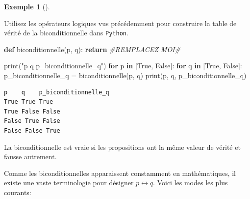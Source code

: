 \documentclass[
  letterpaper,
]{scrbook}
\newenvironment{Shaded}{}{}
\newcommand{\BuiltInTok}[1]{#1}
\newcommand{\CommentTok}[1]{\textcolor[rgb]{0.38,0.63,0.69}{\textit{#1}}}
\newcommand{\ControlFlowTok}[1]{\textcolor[rgb]{0.00,0.44,0.13}{\textbf{#1}}}
\newcommand{\KeywordTok}[1]{\textcolor[rgb]{0.00,0.44,0.13}{\textbf{#1}}}
\newcommand{\NormalTok}[1]{#1}
\newcommand{\OperatorTok}[1]{\textcolor[rgb]{0.40,0.40,0.40}{#1}}
\newcommand{\StringTok}[1]{\textcolor[rgb]{0.25,0.44,0.63}{#1}}
\newcommand{\VariableTok}[1]{\textcolor[rgb]{0.10,0.09,0.49}{#1}}
\theoremstyle{definition}
\newtheorem{example}{Exemple}[chapter]
\theoremstyle{definition}
\theoremstyle{plain}
\theoremstyle{remark}
\begin{document}
\leavevmode{}%
\begin{example}[]\label{exm-biconditionnelle-python}

Utilisez les opérateurs logiques vus précédemment pour construire la
table de vérité de la biconditionnelle dans \texttt{Python}.

\hypertarget{biconditionnelle-python-todo}{}
\begin{Shaded}
\begin{Highlighting}[]
\KeywordTok{def}\NormalTok{ biconditionnelle(p, q):}
    \ControlFlowTok{return} \CommentTok{\#REMPLACEZ MOI\#}

\BuiltInTok{print}\NormalTok{(}\StringTok{"p    q    p\_biconditionnelle\_q"}\NormalTok{)}
\ControlFlowTok{for}\NormalTok{ p }\KeywordTok{in}\NormalTok{ [}\VariableTok{True}\NormalTok{, }\VariableTok{False}\NormalTok{]:}
    \ControlFlowTok{for}\NormalTok{ q }\KeywordTok{in}\NormalTok{ [}\VariableTok{True}\NormalTok{, }\VariableTok{False}\NormalTok{]:}
\NormalTok{        p\_biconditionnelle\_q }\OperatorTok{=}\NormalTok{ biconditionnelle(p, q)}
        \BuiltInTok{print}\NormalTok{(p, q, p\_biconditionnelle\_q)}
\end{Highlighting}
\end{Shaded}

\hypertarget{biconditionnelle-python}{}
\begin{verbatim}
p    q    p_biconditionnelle_q
True True True
True False False
False True False
False False True
\end{verbatim}

\end{example}

\begin{tcolorbox}[enhanced jigsaw, colframe=quarto-callout-important-color-frame, bottomtitle=1mm, coltitle=black, breakable, arc=.35mm, title=\textcolor{quarto-callout-important-color}{\faExclamation}\hspace{0.5em}{Important}, opacitybacktitle=0.6, colback=white, opacityback=0, colbacktitle=quarto-callout-important-color!10!white, leftrule=.75mm, rightrule=.15mm, titlerule=0mm, toprule=.15mm, toptitle=1mm, left=2mm, bottomrule=.15mm]

La biconditionnelle est vraie si les propositions ont la même valeur de
vérité et fausse autrement.

\end{tcolorbox}

Comme les biconditionnelles apparaissent constamment en mathématiques,
il existe une vaste terminologie pour désigner \(p\leftrightarrow q\).
Voici les modes les plus courants:
\end{document}
